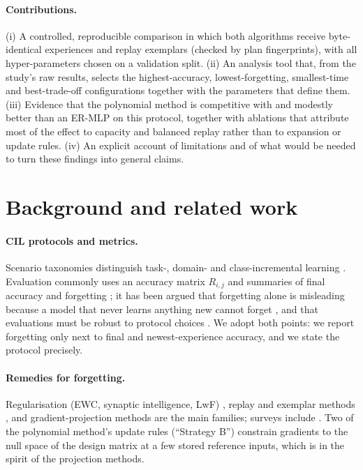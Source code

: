 \documentclass[11pt,a4paper]{article}
\begin{document}
\paragraph{Contributions.}
(i) A controlled, reproducible comparison in which both algorithms receive byte-identical experiences and replay exemplars (checked by plan fingerprints), with all hyper-parameters chosen on a validation split. (ii) An analysis tool that, from the study's raw results, selects the highest-accuracy, lowest-forgetting, smallest-time and best-trade-off configurations together with the parameters that define them. (iii) Evidence that the polynomial method is competitive with and modestly better than an ER-MLP on this protocol, together with ablations that attribute most of the effect to capacity and balanced replay rather than to expansion or update rules. (iv) An explicit account of limitations and of what would be needed to turn these findings into general claims.

\section{Background and related work}
\paragraph{CIL protocols and metrics.}
Scenario taxonomies distinguish task-, domain- and class-incremental learning \cite{vandeven2019,hsu2018}. Evaluation commonly uses an accuracy matrix $R_{i,j}$ and summaries of final accuracy and forgetting \cite{chaudhry2018riemannian,delange2021}; it has been argued that forgetting alone is misleading because a model that never learns anything new cannot forget \cite{chaudhry2018riemannian,diaz2018}, and that evaluations must be robust to protocol choices \cite{farquhar2018}. We adopt both points: we report forgetting only next to final and newest-experience accuracy, and we state the protocol precisely.

\paragraph{Remedies for forgetting.}
Regularisation (EWC, synaptic intelligence, LwF) \cite{kirkpatrick2017,zenke2017,li2018}, replay and exemplar methods \cite{rebuffi2017,lopezpaz2017,chaudhry2019tiny}, and gradient-projection methods \cite{farajtabar2020,saha2021} are the main families; surveys include \cite{delange2021,mai2022}. Two of the polynomial method's update rules (``Strategy B'') constrain gradients to the null space of the design matrix at a few stored reference inputs, which is in the spirit of the projection methods.
\end{document}
